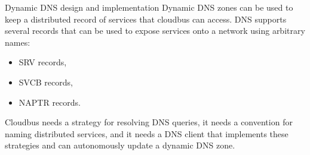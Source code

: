 \begin{frame}
{\begin{block}{Dynamic DNS design and implementation}
			Dynamic DNS zones can be used to keep a distributed record of services that cloudbus can access. DNS supports several records that %
			can be used to expose services onto a network using arbitrary names:
			\small
			\begin{itemize}
				\item SRV records,
				\item SVCB records,
				\item NAPTR records.
			\end{itemize}
			\normalsize
			Cloudbus needs a strategy for resolving DNS queries, it needs a convention for naming distributed services, %
			and it needs a DNS client that implements these strategies and can autonomously update a dynamic DNS zone.
		\end{block}
	}
\end{frame}